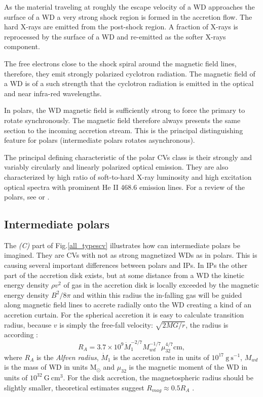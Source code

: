 \documentclass[oneside,a4paper,11pt]{report}
\begin{document}
As the material traveling at roughly the escape velocity of a WD approaches the surface of a WD a very strong shock 
region is formed in the accretion flow. The hard X-rays are emitted from the post-shock region. A fraction of X-rays is reprocessed 
by the surface of a WD and re-emitted as the softer X-rays component. 

The free electrons close to the shock spiral around the magnetic field lines, therefore, they emit strongly polarized 
cyclotron radiation. The magnetic field of a WD is of a such strength that the cyclotron radiation is emitted in the optical and 
near infra-red wavelengths.               

In polars, the WD magnetic field is sufficiently strong to force the primary to rotate synchronously. The magnetic field 
therefore always presents the same section to the incoming accretion stream. This is the principal distinguishing feature 
for polars (intermediate polars rotates asynchronous).   

The principal defining characteristic of the polar CVs class is their strongly and variably circularly 
and linearly polarized optical emission. They are also characterized by high ratio of soft-to-hard X-ray 
luminosity and high excitation optical spectra with prominent He II 468.6 emission lines. For a review of the polars, see \citet{1990SSRv...54..195C}
or \citet{warner:1}.  

\subsection{Intermediate polars}
The \textit{(C)} part of Fig.\ref{all_typescv} illustrates how can intermediate polars be imagined. 
They are CVs with not as strong magnetized WDs as in polars. This is causing several important 
differences between polars and IPs. In IPs the other part of the accretion disk exists, but at some 
distance from a WD the kinetic energy density $\rho v^2$ of gas in the accretion disk is locally exceeded by the
 magnetic energy density $B^2/8\pi$ and within this radius the in-falling gas will be guided along magnetic 
field lines to accrete radially onto the WD creating a kind of an accretion curtain.  
For the spherical accretion it is easy to calculate transition radius, because $v$ is simply the 
free-fall velocity: $\sqrt{2MG/r}$, the radius is according \citet{1994PASP..106..209P}:
\begin{equation}
\label{ipra}
R_A = 3.7 \times 10^9 \dot{M}_{1}^{-2/7}M_{wd}^{-1/7}\mu_{32}^{4/7} \mathrm{cm},
\end{equation}
where $R_A$ is the \textit{Alfven radius}, $\dot{M}_{1}$ is the accretion rate in 
units of $10^{17}\:\mathrm{g\:s^{-1}}$, $M_{wd}$ is the mass of WD in units $\mathrm{M_\odot}$ and $\mu_{32}$ is the magnetic moment 
of the WD in units of $10^{32}\:\mathrm{G\:cm^3}$. For the disk accretion, the magnetospheric radius should be slightly 
smaller, theoretical estimates suggest $R_{mag} \approx 0.5R_A$ \citet{1994PASP..106..209P}.  
\end{document}
